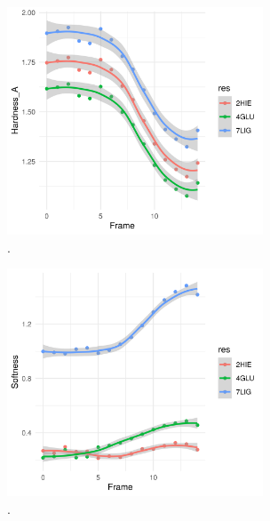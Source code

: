 \documentclass[a4paper,11pt]{refart}
\begin{document}
\hspace*{-\leftmarginwidth}
\begin{minipage}{\fullwidth}
	\begin{figure}[H]
		\begin{center}
			\includegraphics[width=3in]{images/tut6_img15}
			\caption{.}
			\label{fig_tut6_14}
		\end{center}
	\end{figure}
\end{minipage}


\hspace*{-\leftmarginwidth}
\begin{minipage}{\fullwidth}
	\begin{figure}[H]
		\begin{center}
			\includegraphics[width=3in]{images/tut6_img16}
			\caption{.}
			\label{fig_tut6_15}
		\end{center}
	\end{figure}
\end{minipage}
\end{document}
